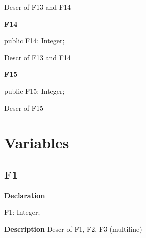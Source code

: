 \documentclass{report}
\newif\ifpdf
\begin{document}
\begin{list}{}
\par Descr of F13 and F14\label{ok_multiple_fields.TRec2-F14}
\item[\textbf{F14}\hfill]
\ifpdf
\begin{flushleft}
\fi
\begin{ttfamily}
public F14: Integer;\end{ttfamily}

\ifpdf
\end{flushleft}
\fi


\par Descr of F13 and F14\label{ok_multiple_fields.TRec2-F15}
\item[\textbf{F15}\hfill]
\ifpdf
\begin{flushleft}
\fi
\begin{ttfamily}
public F15: Integer;\end{ttfamily}

\ifpdf
\end{flushleft}
\fi


\par Descr of F15\end{list}
\section{Variables}
\ifpdf
\subsection*{\large{\textbf{F1}}\normalsize\hspace{1ex}\hrulefill}
\else
\subsection*{F1}
\fi
\label{ok_multiple_fields-F1}
\begin{list}{}{
\setlength{\itemindent}{0cm}
\setlength{\listparindent}{0cm}
\setlength{\leftmargin}{\evensidemargin}
\addtolength{\leftmargin}{\tmplength}
\settowidth{\labelsep}{X}
\addtolength{\leftmargin}{\labelsep}
\setlength{\labelwidth}{\tmplength}
}
\item[\textbf{Declaration}\hfill]
\ifpdf
\begin{flushleft}
\fi
\begin{ttfamily}
F1: Integer;\end{ttfamily}

\ifpdf
\end{flushleft}
\fi

\par
\item[\textbf{Description}]
Descr of F1, F2, F3 (multiline)

\end{list}
\ifpdf
\end{document}
